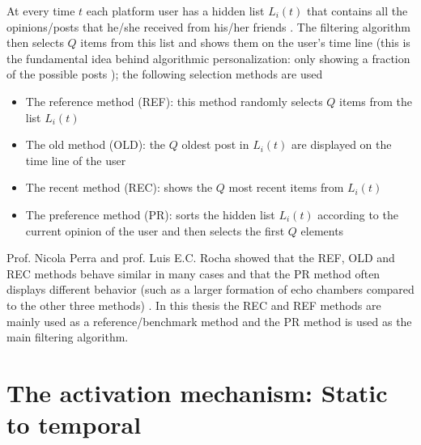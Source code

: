 \documentclass[11 pt , letterpaper , twoside , openright]{book}
\begin{document}
\newline
At every time $t$ each platform user has a hidden list $L_i(t)$ that contains all the opinions/posts that he/she received from his/her friends \cite{Perra2019}. The filtering algorithm then selects $Q$ items from this list and shows them on the user's time line (this is the fundamental idea behind algorithmic personalization: only showing a fraction of the possible posts \cite{Perra2019}); the following selection methods are used \cite{Perra2019}
\begin{itemize}
	\item The reference method (REF): this method randomly selects $Q$ items from the list $L_i(t)$
	\item The old method (OLD): the $Q$ oldest post in $L_i(t)$ are displayed on the time line of the user
	\item The recent method (REC): shows the $Q$ most recent items from $L_i(t)$
	\item The preference method (PR): sorts the hidden list $L_i(t)$ according to the current opinion of the user and then selects the first $Q$ elements
\end{itemize}
Prof. Nicola Perra and prof. Luis E.C. Rocha showed that the REF, OLD and REC methods behave similar in many cases and that the PR method often displays different behavior (such as a larger formation of echo chambers compared to the other three methods) \cite{Perra2019}. In this thesis the REC and REF methods are mainly used as a reference/benchmark method and the PR method is used as the main filtering algorithm.

\section{The activation mechanism: Static to temporal}\label{actMech}
\end{document}
